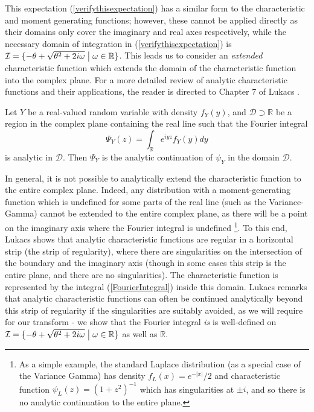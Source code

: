 \documentclass{article}
\begin{document}
This expectation (\ref{verifythisexpectation}) has a similar form to the characteristic and moment generating functions; however, these cannot be applied directly as their domains only cover the imaginary and real axes respectively, while the necessary domain of integration in (\ref{verifythisexpectation}) is $\mathcal{I} = \{-\theta + \sqrt{\theta^2 + 2i\omega}\hspace{0.1cm}\big\vert \hspace{0.1cm}\omega\in\mathbb{R}\}$. This leads us to consider an \textit{extended} characteristic function which extends the domain of the characteristic function into the complex plane. For a more detailed review of analytic characteristic functions and their applications, the reader is directed to Chapter 7 of Lukacs \cite{Lukacs}.

\begin{definition}
    Let $Y$ be a real-valued random variable with density $f_Y(y)$, and $\mathcal{D}\supset\mathbb{R}$ be a region in the complex plane containing the real line such that the Fourier integral
    \begin{equation}\label{FourierIntegral}
        \Psi_Y(z) = \int_{\mathbb{R}}e^{iyz}f_Y(y)dy
    \end{equation}
    is analytic in $\mathcal{D}$. Then $\Psi_Y$ is the analytic continuation of $\psi_Y$ in the domain $\mathcal{D}$.
\end{definition}
In general, it is not possible to analytically extend the characteristic function to the entire complex plane. Indeed, any distribution with a moment-generating function which is undefined for some parts of the real line (such as the Variance-Gamma) cannot be extended to the entire complex plane, as there will be a point on the imaginary axis where the Fourier integral is undefined \footnote{As a simple example, the standard Laplace distribution (as a special case of the Variance Gamma) has density $f_L(x) = e^{-|x|}/2$ and characteristic function $\psi_L(z) = (1+z^2)^{-1}$ which has singularities at $\pm i$, and so there is no analytic continuation to the entire plane.}. To this end, Lukacs shows that analytic characteristic functions are regular in a horizontal strip (the strip of regularity), where there are singularities on the intersection of the boundary and the imaginary axis (though in some cases this strip is the entire plane, and there are no singularities). The characteristic function is represented by the integral (\ref{FourierIntegral}) inside this domain. Lukacs remarks that analytic characteristic functions can often be continued analytically beyond this strip of regularity if the singularities are suitably avoided, as we will require for our transform - we show that the Fourier integral \textit{is} is well-defined on $\mathcal{I} = \{-\theta + \sqrt{\theta^2 + 2i\omega}\hspace{0.1cm}\big\vert \hspace{0.1cm}\omega\in\mathbb{R}\}$ as well as $\mathbb{R}$.
\end{document}
